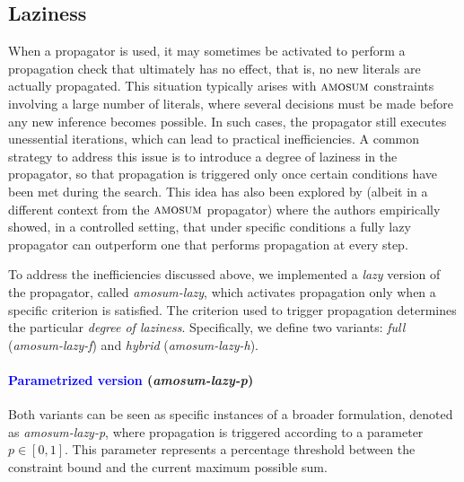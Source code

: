 \documentclass[preprint,authoryear]{elsarticle}
\theoremstyle{definition}
\def\amosum{\ensuremath{\textsc{amosum}}\xspace}
\begin{document}
\subsection{Laziness}
\label{sub:sec:laziness}

When a propagator is used, it may sometimes be activated to perform a propagation check that ultimately has no effect, that is, no new literals are actually propagated.
This situation typically arises with \amosum constraints involving a large number of literals, where several decisions must be made before any new inference becomes possible. In such cases, the propagator still executes unessential iterations, which can lead to practical inefficiencies.
A common strategy to address this issue is to introduce a degree of laziness in the propagator, so that propagation is triggered only once certain conditions have been met during the search. This idea has also been explored by \cite{DBLP:journals/tplp/CuteriDRS17} (albeit in a different context from the \amosum propagator) where the authors empirically showed, in a controlled setting, that under specific conditions a fully lazy propagator can outperform one that performs propagation at every step.

To address the inefficiencies discussed above, we implemented a \emph{lazy} version of the propagator, called \emph{amosum-lazy}, which activates propagation only when a specific criterion is satisfied.  
The criterion used to trigger propagation determines the particular \emph{degree of laziness}.  
Specifically, we define two variants: \emph{full} (\emph{amosum-lazy-f}) and \emph{hybrid} (\emph{amosum-lazy-h}).

\paragraph{\textcolor{blue}{Parametrized version} (\emph{amosum-lazy-p})}
Both variants can be seen as specific instances of a broader formulation, denoted as \emph{amosum-lazy-p}, where propagation is triggered according to a parameter $p \in [0,1]$.  
This parameter represents a percentage threshold between the constraint bound and the current maximum possible sum.
\end{document}
